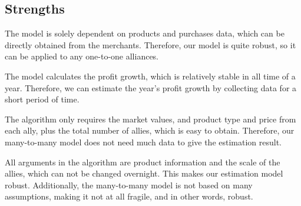 \subsection{Strengths}
\begin{enumerate}

The model is solely dependent on products and purchases data, which can be directly obtained from the merchants. Therefore, our model is quite robust, so it can be applied to any one-to-one alliances.


The model calculates the profit growth, which is relatively stable in all time of a year. Therefore, we can estimate the year's profit growth by collecting data for a short period of time.


The algorithm only requires the market values, and product type and price from each ally, plus the total number of allies, which is easy to obtain. Therefore, our many-to-many model does not need much data to give the estimation result.


All arguments in the algorithm are product information and the scale of the allies, which can not be changed overnight. This makes our estimation model robust. Additionally, the many-to-many model is not based on many assumptions, making it not at all fragile, and in other words, robust.
\end{enumerate}

